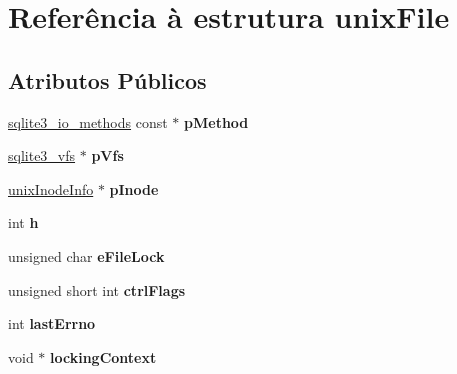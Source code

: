 \hypertarget{structunix_file}{\section{Referência à estrutura unix\-File}
\label{structunix_file}
}
\subsection*{Atributos Públicos}
\begin{DoxyCompactItemize}
\item 
\hypertarget{structunix_file_a2a2b40e965f91aa9ee21135bfb0c17ec}{\hyperlink{structsqlite3__io__methods}{sqlite3\-\_\-io\-\_\-methods} const $\ast$ {\bfseries p\-Method}}\label{structunix_file_a2a2b40e965f91aa9ee21135bfb0c17ec}

\item 
\hypertarget{structunix_file_a048d696479bb2544ab2cec1ac9a75d67}{\hyperlink{structsqlite3__vfs}{sqlite3\-\_\-vfs} $\ast$ {\bfseries p\-Vfs}}\label{structunix_file_a048d696479bb2544ab2cec1ac9a75d67}

\item 
\hypertarget{structunix_file_ac17292fe29bb6cc9eceed9db6d1209e8}{\hyperlink{structunix_inode_info}{unix\-Inode\-Info} $\ast$ {\bfseries p\-Inode}}\label{structunix_file_ac17292fe29bb6cc9eceed9db6d1209e8}

\item 
\hypertarget{structunix_file_a1c58798d4ff3ac6232765c8b76bb7450}{int {\bfseries h}}\label{structunix_file_a1c58798d4ff3ac6232765c8b76bb7450}

\item 
\hypertarget{structunix_file_a001e59bdb9d3f396952c2c8e3229f7fc}{unsigned char {\bfseries e\-File\-Lock}}\label{structunix_file_a001e59bdb9d3f396952c2c8e3229f7fc}

\item 
\hypertarget{structunix_file_a05d9d0af8aa4d9de6a250984cc12ae56}{unsigned short int {\bfseries ctrl\-Flags}}\label{structunix_file_a05d9d0af8aa4d9de6a250984cc12ae56}

\item 
\hypertarget{structunix_file_afde57c2e118fac8041918dac2ee6f7d1}{int {\bfseries last\-Errno}}\label{structunix_file_afde57c2e118fac8041918dac2ee6f7d1}

\item 
\hypertarget{structunix_file_afaeb4425a6de3e913db4b03e8a0d098a}{void $\ast$ {\bfseries locking\-Context}}\label{structunix_file_afaeb4425a6de3e913db4b03e8a0d098a}


\end{DoxyCompactItemize}

